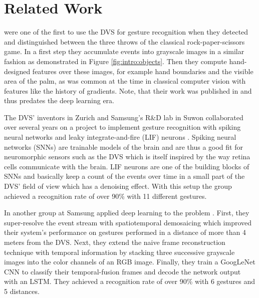 \chapter{Related Work}
\label{cha:related-work}

\citeauthor{manualfeatures} were one of the first to use the DVS for gesture
recognition when they detected and distinguished between the three throws of the
classical rock-paper-scissors game. In a first step they accumulate events into
grayscale images in a similar fashion as demonstrated in Figure
\ref{fig:intro:objects}. Then they compute hand-designed features over these
images, for example hand boundaries and the visible area of the palm, as was
common at the time in classical computer vision with features like the history
of gradients. Note, that their work was published in \citeyear{manualfeatures}
and thus predates the deep learning era.

The DVS' inventors in Zurich and Samsung's R\&D lab in Suwon collaborated over
several years on a project to implement gesture recognition with spiking neural
networks and leaky integrate-and-fire (LIF) neurons
\cite{lif12,lifhmm12,livedemo}. Spiking neural networks (SNNs) are trainable
models of the brain and are thus a good fit for neuromorphic sensors such as the
DVS which is itself inspired by the way retina cells communicate with the brain.
LIF neurons are one of the building blocks of SNNs and basically keep a count of
the events over time in a small part of the DVS' field of view which has a
denoising effect. With this setup the group achieved a recognition rate of over
90\% with 11 different gestures.

In \citeyear{spatiotemporal} another group at Samsung applied deep learning to
the problem \cite{spatiotemporal}. First, they super-resolve the event stream
with spatiotemporal demosaicing which improved their system's performance on
gestures performed in a distance of more than 4 meters from the DVS. Next, they
extend the naive frame reconstruction technique with temporal information by
stacking three successive grayscale images into the color channels of an RGB
image. Finally, they train a GoogLeNet CNN to classify their temporal-fusion
frames and decode the network output with an LSTM. They achieved a recognition
rate of over 90\% with 6 gestures and 5 distances.
